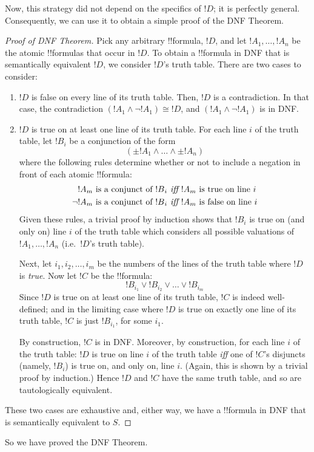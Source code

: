 \documentclass[../../../include/open-logic-section]{subfiles}
\begin{document}
Now, this strategy did not depend on the specifics of ${!D}$; it is perfectly general. Consequently, we can use it to obtain a simple proof of the DNF Theorem.

\begin{proof}[Proof of DNF Theorem]
Pick any arbitrary !!{formula}, ${!D}$, and let ${!A}_1, \ldots, {!A}_n$ be the atomic !!{formula}s that occur in ${!D}$. To obtain a !!{formula} in DNF that is semantically equivalent ${!D}$, we consider ${!D}$'s truth table. There are two cases to consider:
	\begin{enumerate}
		\item ${!D}$ is false on every line of its truth table. Then, ${!D}$ is a contradiction. In that case, the contradiction $({!A}_1 \land \lnot {!A}_1) \cong {!D}$, and $({!A}_1 \land \lnot {!A}_1)$ is in DNF. 
	
		\item ${!D}$ is true on at least one line of its truth table.
		For each line $i$ of the truth table, let ${!B}_i$ be a conjunction of the form 
		$$(\pm{!A}_1 \land \ldots \land \pm{!A}_n)$$
		where the following rules determine whether or not to include a negation in front of each atomic !!{formula}:
			\begin{align*}
				{!A}_m\text{ is a conjunct of }{!B}_i&\emph{ iff }{!A}_m\text{ is true on line }i\\
				\lnot{!A}_m\text{ is a conjunct of }{!B}_i&\emph{ iff }{!A}_m\text{ is false on line }i
			\end{align*}
		Given these rules, a trivial proof by induction shows that ${!B}_i$ is true on (and only on) line $i$ of the truth table which considers all possible valuations of ${!A}_1, \ldots, {!A}_n$ (i.e.\ ${!D}$'s truth table). 
		
		Next, let $i_1, i_2, \ldots, i_m$ be the numbers of the lines of the truth table where ${!D}$ is \emph{true}. Now let ${!C}$ be the !!{formula}:
		$${!B}_{i_1} \lor {!B}_{i_2} \lor \ldots \lor {!B}_{i_m}$$
		Since ${!D}$ is true on at least one line of its truth table, ${!C}$ is indeed well-defined; and in the limiting case where ${!D}$ is true on exactly one line of its truth table, ${!C}$ is just ${!B}_{i_1}$, for some $i_1$.
		
		By construction, ${!C}$ is in DNF. Moreover, by construction, for each line $i$ of the truth table: ${!D}$ is true on line $i$ of the truth table \emph{iff} one of ${!C}$'s disjuncts (namely, ${!B}_i$) is true on, and only on, line $i$. (Again, this is shown by a trivial proof by induction.) Hence ${!D}$ and ${!C}$ have the same truth table, and so are tautologically equivalent.
	\end{enumerate}
	These two cases are exhaustive and, either way, we have a !!{formula} in DNF that is semantically  equivalent to ${S}$.
\end{proof}\noindent
So we have proved the DNF Theorem. 
\end{document}
